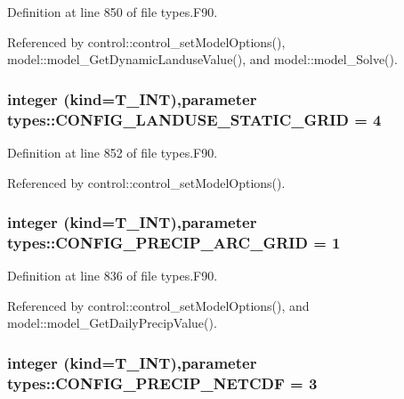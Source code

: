 Definition at line 850 of file types.F90.



Referenced by control::control\_\-setModelOptions(), model::model\_\-GetDynamicLanduseValue(), and model::model\_\-Solve().

\hypertarget{namespacetypes_a1900797780d82e576dffd4a2244c09db}{
\subsubsection[{CONFIG\_\-LANDUSE\_\-STATIC\_\-GRID}]{\setlength{\rightskip}{0pt plus 5cm}integer (kind={\bf T\_\-INT}),parameter {\bf types::CONFIG\_\-LANDUSE\_\-STATIC\_\-GRID} = 4}}
\label{namespacetypes_a1900797780d82e576dffd4a2244c09db}


Definition at line 852 of file types.F90.



Referenced by control::control\_\-setModelOptions().

\hypertarget{namespacetypes_afabf941aeacf590c7e1d6aa9aed0cbbd}{
\subsubsection[{CONFIG\_\-PRECIP\_\-ARC\_\-GRID}]{\setlength{\rightskip}{0pt plus 5cm}integer (kind={\bf T\_\-INT}),parameter {\bf types::CONFIG\_\-PRECIP\_\-ARC\_\-GRID} = 1}}
\label{namespacetypes_afabf941aeacf590c7e1d6aa9aed0cbbd}


Definition at line 836 of file types.F90.



Referenced by control::control\_\-setModelOptions(), and model::model\_\-GetDailyPrecipValue().

\hypertarget{namespacetypes_af0fe53cfc13c9f0ce2c3a80d2732c602}{
\subsubsection[{CONFIG\_\-PRECIP\_\-NETCDF}]{\setlength{\rightskip}{0pt plus 5cm}integer (kind={\bf T\_\-INT}),parameter {\bf types::CONFIG\_\-PRECIP\_\-NETCDF} = 3}}
\label{namespacetypes_af0fe53cfc13c9f0ce2c3a80d2732c602}


